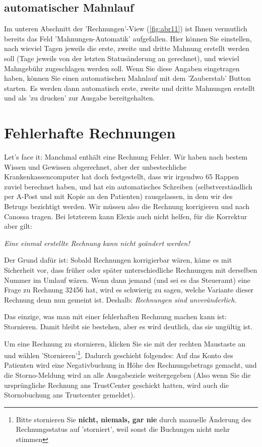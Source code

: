 \documentclass[a4paper]{scrartcl}
\begin{document}
\subsection{automatischer Mahnlauf}
Im unteren Abschnitt der 'Rechnungen'-View (\ref{fig:abr11}) ist Ihnen vermutlich bereits das Feld 'Mahnungen-Automatik' aufgefallen. Hier können Sie einstellen, nach wieviel Tagen jeweils die erste, zweite und dritte Mahnung erstellt werden soll (Tage jeweils von der letzten Statusänderung an gerechnet), und wieviel Mahngebühr zugeschlagen werden soll. Wenn Sie diese Angaben eingetragen haben, können Sie einen automatischen Mahnlauf mit dem 'Zauberstab' Button starten. Es werden dann automatisch erste, zweite und dritte Mahnungen erstellt und als 'zu drucken' zur Ausgabe bereitgehalten.

\section{Fehlerhafte Rechnungen}
Let's face it: Manchmal enthält eine Rechnung Fehler. Wir haben nach bestem Wissen und Gewissen abgerechnet, aber der unbestechliche Krankenkassencomputer hat doch festgestellt, dass wir irgendwo 65 Rappen zuviel berechnet haben, und hat ein automatisches Schreiben (selbstverständlich per A-Post und mit Kopie an den Patienten) rausgelassen, in dem wir des Betrugs bezichtigt werden. Wir müssen also die Rechnung korrigieren und nach Canossa tragen. Bei letzterem kann Elexis auch nicht helfen, für die Korrektur aber gilt:

\medskip

\textit{Eine einmal erstellte Rechnung kann nicht geändert werden!}

\medskip

Der Grund dafür ist: Sobald Rechnungen korrigierbar wären, käme es mit Sicherheit vor, dass früher oder später unterschiedliche Rechnungen mit derselben Nummer im Umlauf wären. Wenn dann jemand (und sei es das Steueramt) eine Frage zu Rechnung 32456 hat, wird es schwierig zu sagen, welche Variante dieser Rechnung denn nun gemeint ist. Deshalb: \textit{Rechnungen sind unveränderlich}.

Das einzige, was man mit einer fehlerhaften Rechnung machen kann ist: Stornieren. Damit bleibt sie bestehen, aber es wird deutlich, das sie ungültig ist.

\medskip

Um eine Rechnung zu stornieren, klicken Sie sie mit der rechten Maustaste an und wählen 'Stornieren'\footnote{Bitte stornieren Sie \textbf{nicht, niemals, gar nie} durch manuelle Änderung des Rechnungsstatus auf 'storniert', weil sonst die Buchungen nicht mehr stimmen}. Dadurch geschieht folgendes: Auf das Konto des Patienten wird eine Negativbuchung in Höhe des Rechnungsbetrags gemacht, und die Storno-Meldung wird an alle Ausgabeziele weitergegeben (Also wenn Sie die ursprüngliche Rechnung ans TrustCenter geschickt hatten, wird auch die Stornobuchung ans Trustcenter gemeldet).
\end{document}
